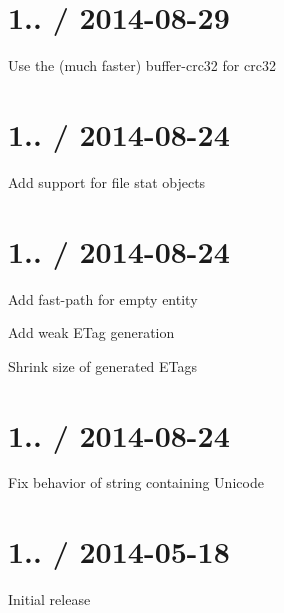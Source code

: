 \section*{1.. / 2014-\/08-\/29 }


\begin{DoxyItemize}
\item Use the (much faster) {\ttfamily buffer-\/crc32} for crc32
\end{DoxyItemize}

\section*{1.. / 2014-\/08-\/24 }


\begin{DoxyItemize}
\item Add support for file stat objects
\end{DoxyItemize}

\section*{1.. / 2014-\/08-\/24 }


\begin{DoxyItemize}
\item Add fast-\/path for empty entity
\item Add weak E\+Tag generation
\item Shrink size of generated E\+Tags
\end{DoxyItemize}

\section*{1.. / 2014-\/08-\/24 }


\begin{DoxyItemize}
\item Fix behavior of string containing Unicode
\end{DoxyItemize}

\section*{1.. / 2014-\/05-\/18 }


\begin{DoxyItemize}
\item Initial release 
\end{DoxyItemize}
